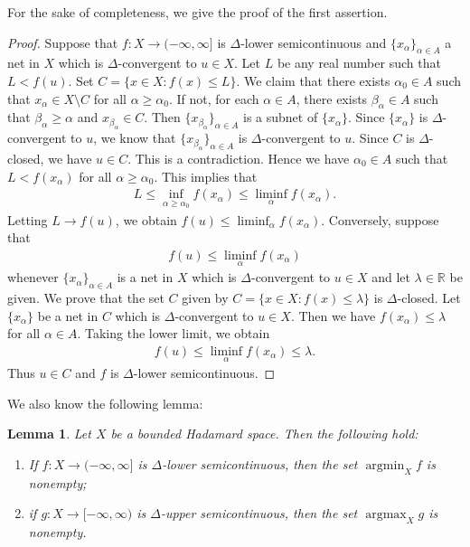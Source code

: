 \documentclass[draft]{amsart}
\numberwithin{equation}{section}
\def\R{\mathbb R}
\DeclareMathOperator*{\Argmin}{argmin}
\DeclareMathOperator*{\Argmax}{argmax}
\theoremstyle{plain}
\newtheorem{lemma}[theorem]{Lemma}
\theoremstyle{definition}
\theoremstyle{remark}
\begin{document}
For the sake of completeness, we give the proof of the first assertion. 
\begin{proof}

Suppose that $f\colon X\to (-\infty, \infty]$ 
is $\Delta$-lower semicontinuous 
and $\{x_{\alpha}\}_{\alpha\in A}$ a net in $X$ which is $\Delta$-convergent 
to $u\in X$. Let $L$ be any real number such that 
$L < f(u)$. Set $C=\{x\in X: f(x)\leq L\}$. 
We claim that there exists 
$\alpha_0\in A$ such that $x_{\alpha}\in X\setminus C$ for all $\alpha \geq \alpha_0$. 
If not, for each $\alpha\in A$, there exists 
$\beta_{\alpha}\in A$ such that $\beta_{\alpha}\geq \alpha$ 
and $x_{\beta_{\alpha}}\in C$. Then $\{x_{\beta_{\alpha}}\}_{\alpha\in A}$ 
is a subnet of $\{x_{\alpha}\}$. Since $\{x_{\alpha}\}$ is $\Delta$-convergent to $u$, 
we know that $\{x_{\beta_{\alpha}}\}_{\alpha\in A}$ is $\Delta$-convergent to $u$. 
Since $C$ is $\Delta$-closed, we have $u\in C$. This is a contradiction. 
Hence we have $\alpha_0\in A$ such that 
$L < f(x_{\alpha})$ for all $\alpha \geq \alpha_0$. This implies that 
\begin{align}
 L \leq \inf_{\alpha\geq \alpha_0} f(x_{\alpha}) 
 \leq \liminf_{\alpha}f(x_{\alpha}). 
\end{align}
Letting $L \to f(u)$, we obtain $f(u)\leq \liminf_{\alpha}f(x_{\alpha})$. 
Conversely, suppose that 
\begin{align}
 f(u)\leq \liminf_{\alpha}f(x_{\alpha})
\end{align}
whenever $\{x_{\alpha}\}_{\alpha \in A}$ is a net in $X$ which is $\Delta$-convergent 
to $u\in X$ and let $\lambda\in \R$ be given. We prove that 
the set $C$ given by $C=\{x\in X: f(x)\leq \lambda\}$ is $\Delta$-closed. 
Let $\{x_{\alpha}\}$ be a net in $C$ which is $\Delta$-convergent to $u\in X$. 
Then we have $f(x_{\alpha})\leq \lambda$ for all $\alpha\in A$. 
Taking the lower limit, we obtain 
\begin{align}
 f(u)\leq \liminf_{\alpha}f(x_{\alpha}) \leq \lambda. 
\end{align}
Thus $u\in C$ and $f$ is $\Delta$-lower semicontinuous.  
\end{proof}

We also know the following lemma: 

\begin{lemma}\label{lem:Delta-bdd}
 Let $X$ be a bounded Hadamard space. Then the following hold: 
 \begin{enumerate}
  \item If $f\colon X\to (-\infty, \infty]$ is $\Delta$-lower semicontinuous, then 
 the set $\Argmin_X f$ is nonempty; 
  \item if $g\colon X\to [-\infty, \infty)$ is $\Delta$-upper semicontinuous, then 
 the set $\Argmax_X g$ is nonempty. 
 \end{enumerate}
\end{lemma}
\end{document}
